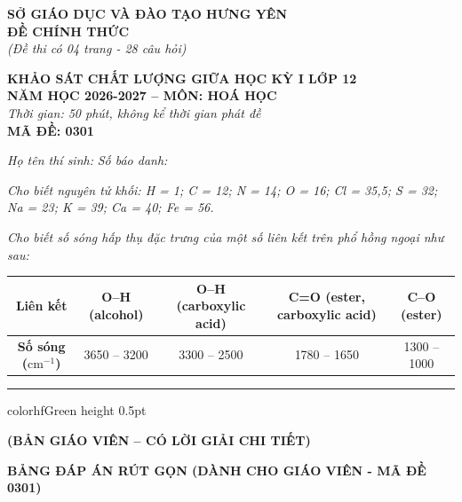 \documentclass[11pt,a4paper]{article}
\begin{document}
\begin{minipage}[t]{0.48\textwidth}
\textbf{SỞ GIÁO DỤC VÀ ĐÀO TẠO HƯNG YÊN}\\
\textbf{ĐỀ CHÍNH THỨC}\\
\textit{(Đề thi có 04 trang - 28 câu hỏi)}
\end{minipage}
\hfill
\begin{minipage}[t]{0.48\textwidth}
\raggedleft
\textbf{\color{hfRed}KHẢO SÁT CHẤT LƯỢNG GIỮA HỌC KỲ I LỚP 12}\\
\textbf{NĂM HỌC 2026-2027 -- MÔN: HOÁ HỌC}\\
\textit{Thời gian: 50 phút, không kể thời gian phát đề}\\
\textbf{MÃ ĐỀ: 0301}
\end{minipage}

\vspace{4pt}
\noindent
\textit{Họ tên thí sinh:} \dotfill \textit{Số báo danh:} \dotfill

\vspace{3pt}
\noindent
\textit{\footnotesize Cho biết nguyên tử khối: H = 1; C = 12; N = 14; O = 16; Cl = 35,5; S = 32; Na = 23; K = 39; Ca = 40; Fe = 56.}

\vspace{2pt}
\noindent
\textit{\footnotesize Cho biết số sóng hấp thụ đặc trưng của một số liên kết trên phổ hồng ngoại như sau:}
\begin{center}
\renewcommand{\arraystretch}{1.15}
\footnotesize
\begin{tabular}{|c|c|c|c|c|}
\hline
\rowcolor{tableGreen}
\textbf{Liên kết} & \textbf{O--H (alcohol)} & \textbf{O--H (carboxylic acid)} & \textbf{C=O (ester, carboxylic acid)} & \textbf{C--O (ester)} \\
\hline
\textbf{Số sóng ($\text{cm}^{-1}$)} & 3650 -- 3200 & 3300 -- 2500 & 1780 -- 1650 & 1300 -- 1000 \\
\hline
\end{tabular}
\end{center}

\vspace{2pt}
\hrule color{hfGreen} height 0.5pt

\vspace{4pt}
\begin{center}
\textbf{\color{hfRed}\large (BẢN GIÁO VIÊN -- CÓ LỜI GIẢI CHI TIẾT)}
\end{center}

\vspace{2pt}
\begin{center}
{\color{hfRed}\textbf{\large BẢNG ĐÁP ÁN RÚT GỌN (DÀNH CHO GIÁO VIÊN - MÃ ĐỀ 0301)}}
\end{center}
\end{document}
